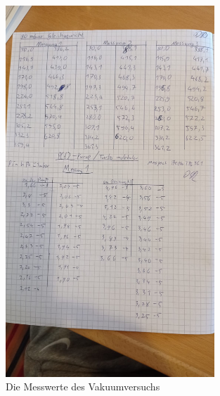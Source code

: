 \begin{figure}[h]
    \centering
    \includegraphics[width=0.7\textwidth]{latex/images/Messwerte_4.jpeg}
    \caption{Die Messwerte des Vakuumversuchs}
\end{figure}


